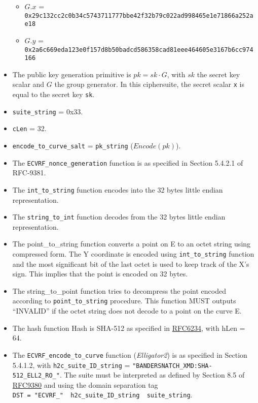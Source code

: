 \documentclass[
]{article}
\providecommand{\tightlist}{%
  \setlength{\itemsep}{0pt}\setlength{\parskip}{0pt}}
\begin{document}
\begin{itemize}
  \begin{itemize}
  \tightlist
  \item
    \(G.x\) =
    \texttt{0x29c132cc2c0b34c5743711777bbe42f32b79c022ad998465e1e71866a252ae18}
  \item
    \(G.y\) =
    \texttt{0x2a6c669eda123e0f157d8b50badcd586358cad81eee464605e3167b6cc974166}
  \end{itemize}
\item
  The public key generation primitive is \(pk = sk \cdot G\), with
  \(sk\) the secret key scalar and \(G\) the group generator. In this
  ciphersuite, the secret scalar \texttt{x} is equal to the secret key
  \texttt{sk}.
\item
  \texttt{suite\_string} = 0x33.
\item
  \texttt{cLen} = 32.
\item
  \texttt{encode\_to\_curve\_salt} = \texttt{pk\_string}
  (\(Encode(pk)\)).
\item
  The \texttt{ECVRF\_nonce\_generation} function is as specified in
  Section 5.4.2.1 of RFC-9381.
\item
  The \texttt{int\_to\_string} function encodes into the 32 bytes little
  endian representation.
\item
  The \texttt{string\_to\_int} function decodes from the 32 bytes little
  endian representation.
\item
  The point\_to\_string function converts a point on E to an octet
  string using compressed form. The Y coordinate is encoded using
  \texttt{int\_to\_string} function and the most significant bit of the
  last octet is used to keep track of the X's sign. This implies that
  the point is encoded on 32 bytes.
\item
  The string\_to\_point function tries to decompress the point encoded
  according to \texttt{point\_to\_string} procedure. This function MUST
  outputs ``INVALID'' if the octet string does not decode to a point on
  the curve E.
\item
  The hash function Hash is SHA-512 as specified in
  \href{https://www.rfc-editor.org/rfc/rfc6234}{RFC6234}, with hLen =
  64.
\item
  The \texttt{ECVRF\_encode\_to\_curve} function (\emph{Elligator2}) is
  as specified in Section 5.4.1.2, with \texttt{h2c\_suite\_ID\_string}
  = \texttt{"BANDERSNATCH\_XMD:SHA-512\_ELL2\_RO\_"}. The suite must be
  interpreted as defined by Section 8.5 of
  \href{https://datatracker.ietf.org/doc/rfc9380/}{RFC9380} and using
  the domain separation tag
  \texttt{DST\ =\ "ECVRF\_"\ \textbar{}\textbar{}\ h2c\_suite\_ID\_string\ \textbar{}\textbar{}\ suite\_string}.
\end{itemize}
\end{document}
